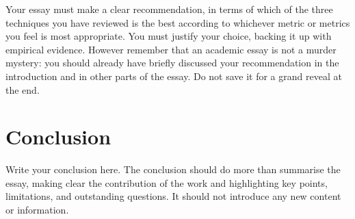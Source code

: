 \documentclass{scrartcl}
\begin{document}
Your essay must make a clear recommendation, in terms of which of the three techniques you have reviewed is the best according to whichever metric or metrics you feel is most appropriate. You must justify your choice, backing it up with empirical evidence. However remember that an academic essay is not a murder mystery: you should already have briefly discussed your recommendation in the introduction and in other parts of the essay. Do not save it for a grand reveal at the end.

\section{Conclusion}

Write your conclusion here. The conclusion should do more than summarise the essay, making clear the contribution of the work and highlighting key points, limitations, and outstanding questions. It should not introduce any new content or information.



\end{document}
